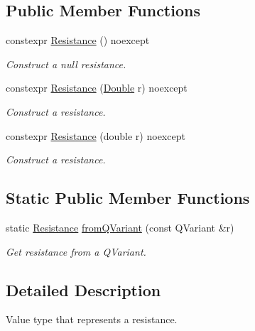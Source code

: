 \subsection*{Public Member Functions}
\begin{DoxyCompactItemize}
\item 
constexpr \hyperlink{class_mdt_1_1_numeric_1_1_resistance_ad1f9115eeae7bb01b54e79d036b2c6f9}{Resistance} () noexcept
\begin{DoxyCompactList}\small\item\em Construct a null resistance. \end{DoxyCompactList}\item 
constexpr \hyperlink{class_mdt_1_1_numeric_1_1_resistance_aab313a78dbace4ea659e49c4353b53dc}{Resistance} (\hyperlink{class_mdt_1_1_numeric_1_1_double}{Double} r) noexcept
\begin{DoxyCompactList}\small\item\em Construct a resistance. \end{DoxyCompactList}\item 
constexpr \hyperlink{class_mdt_1_1_numeric_1_1_resistance_aec246aaa432d9d2985fa4bbfcb81abfb}{Resistance} (double r) noexcept
\begin{DoxyCompactList}\small\item\em Construct a resistance. \end{DoxyCompactList}\end{DoxyCompactItemize}
\subsection*{Static Public Member Functions}
\begin{DoxyCompactItemize}
\item 
static \hyperlink{class_mdt_1_1_numeric_1_1_resistance}{Resistance} \hyperlink{class_mdt_1_1_numeric_1_1_resistance_af2f9019a15179e5e7c13cd31b431c740}{from\+Q\+Variant} (const Q\+Variant \&r)
\begin{DoxyCompactList}\small\item\em Get resistance from a Q\+Variant. \end{DoxyCompactList}\end{DoxyCompactItemize}


\subsection{Detailed Description}
Value type that represents a resistance. 

